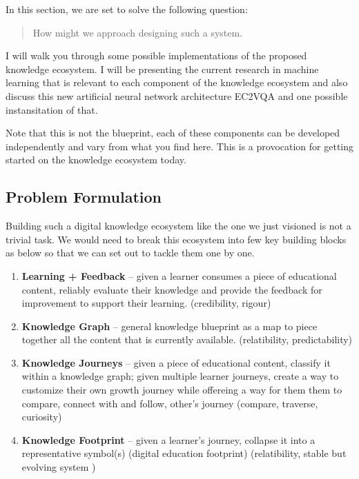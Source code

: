 \documentclass{acm_proc_article-sp}
\begin{document}
In this section, we are set to solve the following question:

\begin{quote}
How might we approach designing such a system.
\end{quote}

I will walk you through some possible implementations of the proposed
knowledge ecosystem. I will be presenting the current research in
machine learning that is relevant to each component of the knowledge
ecosystem and also discuss this new artificial neural network
architecture EC2VQA and one possible instansitation of that.

Note that this is not the blueprint, each of these components can be
developed independently and vary from what you find here. This is a
provocation for getting started on the knowledge ecosystem today.

\subsection{Problem Formulation}\label{problem-formulation}

Building such a digital knowledge ecosystem like the one we just
visioned is not a trivial task. We would need to break this ecosystem
into few key building blocks as below so that we can set out to tackle
them one by one.

\begin{enumerate}
\def\labelenumi{\arabic{enumi}.}
\item
  \textbf{Learning + Feedback} -- given a learner consumes a piece of
  educational content, reliably evaluate their knowledge and provide the
  feedback for improvement to support their learning. (credibility,
  rigour)
\item
  \textbf{Knowledge Graph} -- general knowledge blueprint as a map to
  piece together all the content that is currently available.
  (relatibility, predictability)
\item
  \textbf{Knowledge Journeys} -- given a piece of educational content,
  classify it within a knowledge graph; given multiple learner journeys,
  create a way to customize their own growth journey while offereing a
  way for them them to compare, connect with and follow, other's journey
  (compare, traverse, curiosity)
\item
  \textbf{Knowledge Footprint} -- given a learner's journey, collapse it
  into a representative symbol(s) (digital education footprint)
  (relatibility, stable but evolving system )
\end{enumerate}
\end{document}
